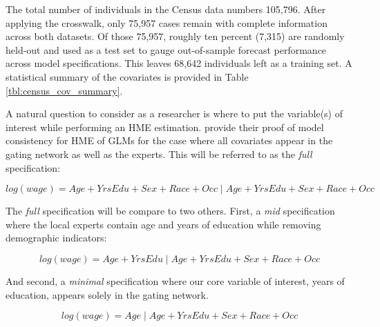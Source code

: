 \documentclass[12pt]{article}
\theoremstyle{definition}
\begin{document}
The total number of individuals in the Census data numbers 105,796.
After applying the crosswalk, only 75,957 cases remain with complete
information across both datasets. Of those 75,957, roughly ten percent
(7,315) are randomly held-out and used as a test set to gauge
out-of-sample forecast performance across model specifications.
This leaves 68,642 individuals left as a training set. A statistical summary
of the covariates is provided in Table \ref{tbl:census_cov_summary}.

\bigskip

A natural question to consider as a researcher is where to put the variable(s)
of interest while performing an HME estimation. \citet{JiangTanner2000}
provide their proof of model consistency for HME of GLMs for the case where
all covariates appear in the gating network as well as the experts. This will
be referred to as the \textit{full} specification:

\begin{equation} \label{eq:full_formula}
  log(wage) = Age + YrsEdu + Sex +  Race + Occ \; | \; Age + YrsEdu + Sex +  Race + Occ
\end{equation}

The \textit{full} specification will be compare to two others.
First, a \textit{mid} specification where the local experts contain age and
years of education while removing demographic indicators:

\begin{equation} \label{eq:mid_formula}
  log(wage) = Age + YrsEdu \; | \; Age + YrsEdu + Sex +  Race + Occ
\end{equation}

And second, a \textit{minimal} specification where our core variable
of interest, years of education, appears solely in the gating network.

\begin{equation} \label{eq:min_formula}
  log(wage) = Age \; | \; Age + YrsEdu + Sex +  Race + Occ
\end{equation}
\end{document}
